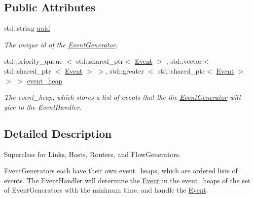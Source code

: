 \subsection*{\-Public \-Attributes}
\begin{DoxyCompactItemize}
\item 
std\-::string \hyperlink{classEventGenerator_af4fa28d08ed4a3be31f9383cf72e0d2c}{uuid}
\begin{DoxyCompactList}\small\item\em \-The unique id of the \hyperlink{classEventGenerator}{\-Event\-Generator}. \end{DoxyCompactList}\item 
\hypertarget{classEventGenerator_a45a8eafc85e9b023411a3ec090528462}{std\-::priority\-\_\-queue\*
$<$ std\-::shared\-\_\-ptr$<$ \hyperlink{classEvent}{\-Event} $>$\*
, std\-::vector$<$ std\-::shared\-\_\-ptr\*
$<$ \hyperlink{classEvent}{\-Event} $>$ $>$, std\-::greater\*
$<$ std\-::shared\-\_\-ptr$<$ \hyperlink{classEvent}{\-Event} $>$ $>$ $>$ \hyperlink{classEventGenerator_a45a8eafc85e9b023411a3ec090528462}{event\-\_\-heap}}\label{classEventGenerator_a45a8eafc85e9b023411a3ec090528462}

\begin{DoxyCompactList}\small\item\em \-The event\-\_\-heap, which stores a list of events that the the \hyperlink{classEventGenerator}{\-Event\-Generator} will give to the \-Event\-Handler. \end{DoxyCompactList}\end{DoxyCompactItemize}


\subsection{\-Detailed \-Description}
\-Superclass for \-Links, \-Hosts, \-Routers, and \-Flow\-Generators. 

\-Event\-Generators each have their own event\-\_\-heaps, which are ordered lists of events. \-The \-Event\-Handler will determine the \hyperlink{classEvent}{\-Event} in the event\-\_\-heaps of the set of \-Event\-Generators with the minimum time, and handle the \hyperlink{classEvent}{\-Event}. 

